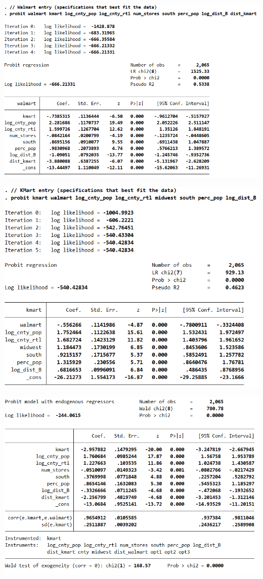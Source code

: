 \documentclass[11pt]{article} %
\begin{document}
\begin{center}
\includegraphics{fig1}

\includegraphics{fig2}

\includegraphics{fig3}


\end{center}
\end{document}
